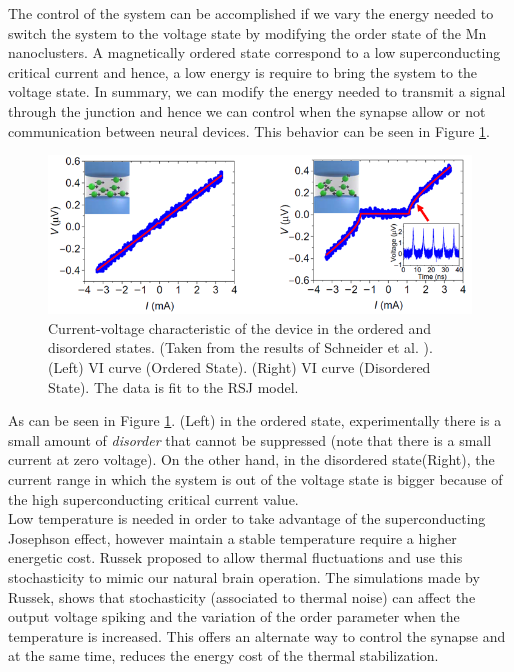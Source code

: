 \documentclass[12pt]{article}
\begin{document}
The control of the system can be accomplished if we vary the energy needed to switch the system to the voltage state by modifying the order state of the Mn nanoclusters. A magnetically ordered state correspond to a low superconducting critical current and hence, a low energy is require to bring the system to the voltage state. In summary, we can modify the energy needed to transmit a signal through the junction and hence we can control when the synapse allow or not communication between neural devices. This behavior can be seen in Figure \ref{VI}.\\


\begin{figure}[ht]
    \centering
     \includegraphics[scale=0.8]{CurveVI.png}
    \caption{Current-voltage characteristic of the device in the ordered and disordered states. (Taken from the results of Schneider et al. \cite{MAINREF}). (Left) VI curve (Ordered State). (Right) VI curve (Disordered State). The data is fit to the RSJ model.}
    \label{VI}
\end{figure}

As can be seen in Figure \ref{VI}. (Left) in the ordered state, experimentally there is a small amount of \textit{disorder} that cannot be suppressed (note that there is a small current at zero voltage). On the other hand, in the disordered state(Right), the current range in which the system is out of the voltage state is bigger because of the high superconducting critical current value.\\

Low temperature is needed in order to take advantage of the superconducting Josephson effect, however maintain a stable temperature require a higher energetic cost. Russek \cite{RUSSEK} proposed to allow thermal fluctuations and use this stochasticity to mimic our natural brain operation. The simulations made by Russek, shows that stochasticity (associated to thermal noise) can affect the output voltage spiking and the variation of the order parameter when the temperature is increased. This offers an alternate way to control the synapse and at the same time, reduces the energy cost of the thermal stabilization.
\end{document}
